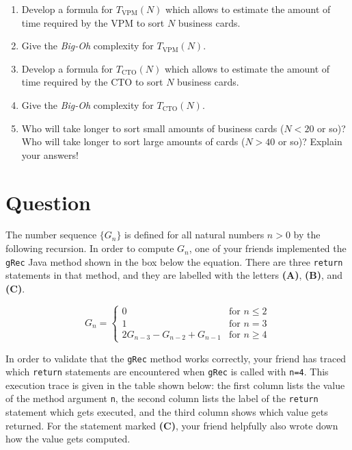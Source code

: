 \documentclass[a4paper]{article}
\newcounter{question}
\newcommand{\question}{\refstepcounter{question}\section*{Question~\thequestion}}
\renewcommand*\thequestion{\arabic{question}}
\begin{document}
\begin{enumerate}
\item
  Develop a formula for $T_\text{VPM}(N)$ which allows to estimate the amount of time required by the VPM to sort $N$ business cards.
\item
  Give the \emph{Big-Oh} complexity for $T_\text{VPM}(N)$.
\item
  Develop a formula for $T_\text{CTO}(N)$ which allows to estimate the amount of time required by the CTO to sort $N$ business cards.
\item
  Give the \emph{Big-Oh} complexity for $T_\text{CTO}(N)$.
\item
  Who will take longer to sort small amounts of business cards ($N<20$ or so)?
  Who will take longer to sort large amounts of cards ($N>40$ or so)?
  Explain your answers!
\end{enumerate}

\clearpage

\question
\label{q:recursion-and-dp}

The number sequence $\{G_n\}$ is defined for all natural numbers $n>0$ by the following recursion.
In order to compute $G_n$, one of your friends implemented the \texttt{gRec} Java method shown in the box below the equation.
There are three \texttt{return} statements in that method, and they are labelled with the letters \textbf{(A)}, \textbf{(B)}, and \textbf{(C)}.

\begin{equation*}
  G_n =
  \begin{cases}
    0 &\text{for } n \le 2 \\
    1 &\text{for } n = 3 \\
    2G_{n-3} - G_{n-2} + G_{n-1} &\text{for } n \ge 4
  \end{cases}
\end{equation*}

\begin{center}
\end{center}

In order to validate that the \texttt{gRec} method works correctly, your friend has traced which \texttt{return} statements are encountered when \texttt{gRec} is called with \texttt{n=4}.
This execution trace is given in the table shown below:
the first column lists the value of the method argument \texttt{n},
the second column lists the label of the \texttt{return} statement which gets executed,
and the third column shows which value gets returned.
For the statement marked \textbf{(C)}, your friend helpfully also wrote down how the value gets computed.
\end{document}
